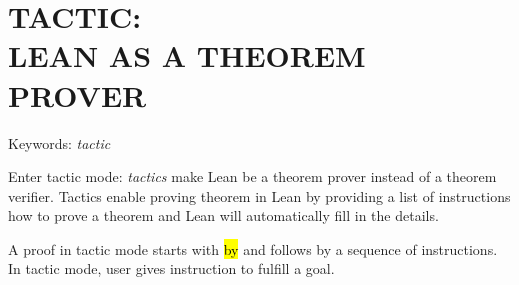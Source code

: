 \chapter{TACTIC: \\ LEAN AS A THEOREM PROVER}

Keywords: \textit{tactic}

Enter tactic mode: \textit{tactics} make Lean be a theorem prover instead of a theorem verifier. Tactics enable proving theorem in Lean by providing a list of instructions how to prove a theorem and Lean will automatically fill in the details.

A proof in tactic mode starts with \hl{by} and follows by a sequence of instructions. In tactic mode, user gives instruction to fulfill a goal.